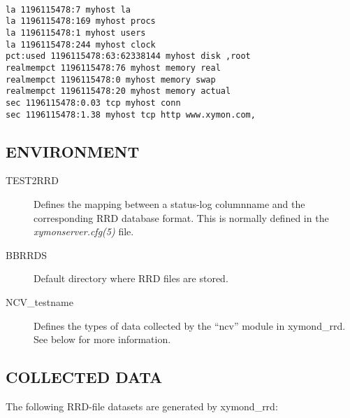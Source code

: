 \begin{description}
 \begin{verbatim}

la 1196115478:7 myhost la
la 1196115478:169 myhost procs
la 1196115478:1 myhost users
la 1196115478:244 myhost clock
pct:used 1196115478:63:62338144 myhost disk ,root
realmempct 1196115478:76 myhost memory real
realmempct 1196115478:0 myhost memory swap
realmempct 1196115478:20 myhost memory actual
sec 1196115478:0.03 tcp myhost conn
sec 1196115478:1.38 myhost tcp http www.xymon.com,

\end{verbatim}



 


 


 


\end{description}
\subsection{ENVIRONMENT}
\begin{description}
\item[TEST2RRD] Defines the mapping between a status-log columnname and the corresponding RRD database format. This is normally defined in the \emph{xymonserver.cfg(5)}
 file. 

 

\item[BBRRDS] Default directory where RRD files are stored. 

 

\item[NCV\_testname] Defines the types of data collected by the ``ncv'' module in xymond\_rrd. See below for more information. 

 


\end{description}
\subsection{COLLECTED DATA}
 The following RRD-file datasets are generated by xymond\_rrd: 

